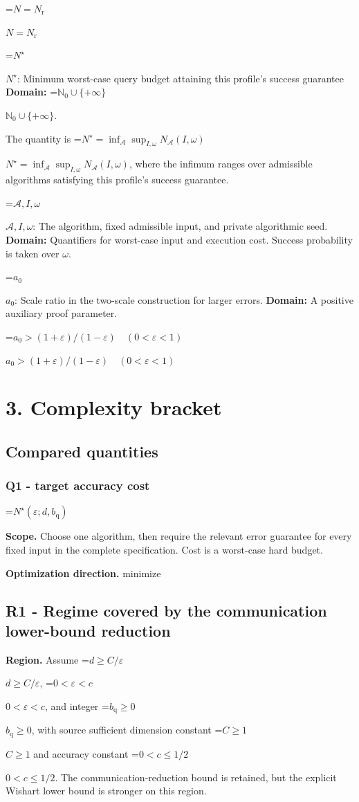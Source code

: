 \documentclass[10pt,a4paper]{article}
\newcommand{\AtlasMath}[1]{\par\begingroup\centering\setbox0=\hbox{$\displaystyle #1$}\ifdim\wd0>1.4\linewidth\typeout{ATLAS WIDE FORMULA: \the\wd0}\fi\ifdim\wd0>\linewidth\resizebox{\linewidth}{!}{\box0}\else\box0\fi\par\endgroup}
\newcommand{\AtlasInlineMath}[1]{\begingroup\setbox0=\hbox{$#1$}\ifdim\wd0>.4\linewidth\endgroup\AtlasMath{#1}\else\endgroup$#1$\fi}
\begin{document}
\AtlasInlineMath{N=N_{\mathrm r}}

\AtlasInlineMath{N^\star}: Minimum worst-case query budget attaining this profile's success guarantee \textbf{Domain:} \AtlasInlineMath{\mathbb N_0\cup\{+\infty\}}.

The quantity is \AtlasInlineMath{N^\star=\inf_{\mathcal A}\sup_{I,\omega}N_{\mathcal A}(I,\omega)}, where the infimum ranges over admissible algorithms satisfying this profile's success guarantee.

\AtlasInlineMath{\mathcal A,I,\omega}: The algorithm, fixed admissible input, and private algorithmic seed. \textbf{Domain:} Quantifiers for worst-case input and execution cost. Success probability is taken over $\omega$.

\AtlasInlineMath{a_0}: Scale ratio in the two-scale construction for larger errors. \textbf{Domain:} A positive auxiliary proof parameter.

\AtlasInlineMath{a_0>(1+\varepsilon)/(1-\varepsilon)\quad(0<\varepsilon<1)}

\section{3. Complexity bracket}
\subsection{Compared quantities}
\subsubsection{Q1 - target accuracy cost}
\AtlasMath{N^\star(\varepsilon;d,b_{\mathrm q})}
\textbf{Scope.} Choose one algorithm, then require the relevant error guarantee for every fixed input in the complete specification. Cost is a worst-case hard budget.

\textbf{Optimization direction.} minimize

\subsection{R1 - Regime covered by the communication lower-bound reduction}
\textbf{Region.} Assume \AtlasInlineMath{d\ge C/\varepsilon}, \AtlasInlineMath{0<\varepsilon<c}, and integer \AtlasInlineMath{b_{\mathrm{q}}\ge0}, with source sufficient dimension constant \AtlasInlineMath{C\ge1} and accuracy constant \AtlasInlineMath{0<c\le1/2}. The communication-reduction bound is retained, but the explicit Wishart lower bound is stronger on this region.
\end{document}
